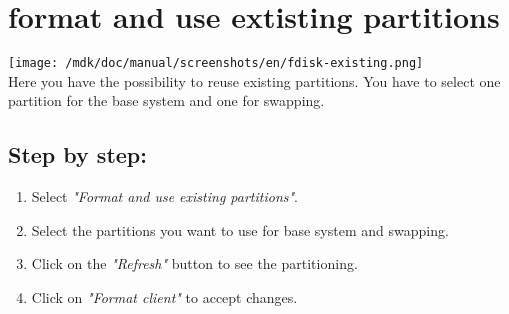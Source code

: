 \section{format and use extisting partitions}
\texttt{[image: /mdk/doc/manual/screenshots/en/fdisk-existing.png]} \\
Here you have the possibility to reuse existing partitions. You have to select one partition for the base system and one for swapping.\\
\subsection{Step by step:}
\begin{enumerate}
\item Select \textit{"Format and use existing partitions"}.\\
\item Select the partitions you want to use for base system and swapping.\\
\item Click on the \textit{"Refresh"} button to see the partitioning.\\
\item Click on \textit{"Format client"} to accept changes.\\
\end{enumerate}
